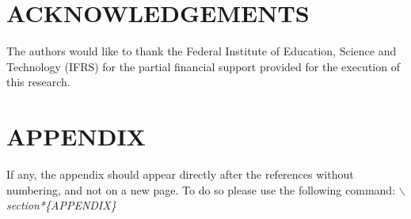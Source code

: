 \documentclass[a4paper,twoside]{article}
\begin{document}
\section*{ACKNOWLEDGEMENTS}

The authors would like to thank the Federal Institute of Education, Science and
Technology (IFRS) for the partial financial support provided for the execution
of this research.


{\small
}

\section*{\uppercase{Appendix}}

If any, the appendix should appear directly after the
references without numbering, and not on a new page. To do so please use the
following command: \textit{$\backslash$section*\{APPENDIX\}}
\end{document}
